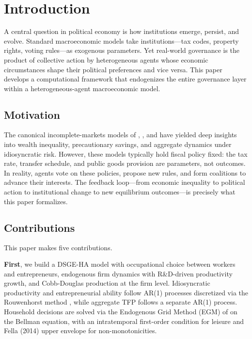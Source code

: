 \documentclass[12pt]{article}
\begin{document}
\newpage
\tableofcontents
\newpage

\section{Introduction}\label{sec:intro}

A central question in political economy is how institutions emerge, persist, and evolve. Standard macroeconomic models take institutions---tax codes, property rights, voting rules---as exogenous parameters. Yet real-world governance is the product of collective action by heterogeneous agents whose economic circumstances shape their political preferences and vice versa. This paper develops a computational framework that endogenizes the entire governance layer within a heterogeneous-agent macroeconomic model.

\subsection{Motivation}

The canonical incomplete-markets models of \citet{aiyagari1994}, \citet{huggett1993}, and \citet{krusellsmith1998} have yielded deep insights into wealth inequality, precautionary savings, and aggregate dynamics under idiosyncratic risk. However, these models typically hold fiscal policy fixed: the tax rate, transfer schedule, and public goods provision are parameters, not outcomes. In reality, agents vote on these policies, propose new rules, and form coalitions to advance their interests. The feedback loop---from economic inequality to political action to institutional change to new equilibrium outcomes---is precisely what this paper formalizes.

\subsection{Contributions}

This paper makes five contributions.

\textbf{First}, we build a DSGE-HA model with occupational choice between workers and entrepreneurs, endogenous firm dynamics with R\&D-driven productivity growth, and Cobb-Douglas production at the firm level. Idiosyncratic productivity and entrepreneurial ability follow AR(1) processes discretized via the Rouwenhorst method \citep{kopeckysuen2010}, while aggregate TFP follows a separate AR(1) process. Household decisions are solved via the Endogenous Grid Method (EGM) of \citet{carroll2006} on the Bellman equation, with an intratemporal first-order condition for leisure and Fella (2014) upper envelope for non-monotonicities.
\end{document}
